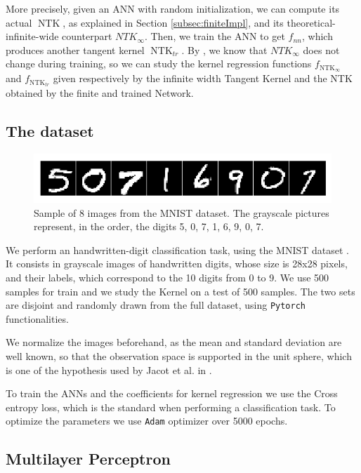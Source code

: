 \documentclass[11pt,notitlepage]{article}
\numberwithin{equation}{section}
\DeclareMathOperator{\NTK}{NTK}
\theoremstyle{remark}
\theoremstyle{definition}
\begin{document}
	More precisely, given an ANN with random initialization, we can compute its actual $\NTK$, as explained in Section \ref{subsec:finiteImpl}, and its theoretical-infinite-wide counterpart $NTK_\infty$.
	Then, we train the ANN to get $f_{nn}$, which produces another tangent kernel $\NTK_{tr}$.
	By \cite{jacot2018neural}, we know that $NTK_\infty$ does not change during training, so we can study the kernel regression functions $f_{\NTK_\infty}$ and $f_{\NTK_{tr}}$ given respectively by the infinite width Tangent Kernel and the NTK obtained by the finite and trained Network.
	
	\subsection{The dataset}\label{subsec:dataset}
	
	\begin{figure}[t]
		\centering
		\includegraphics[width=.75\linewidth]{../Simulations/figures/mnist_sample.png}
		\caption{Sample of 8 images from the MNIST dataset.
			The grayscale pictures represent, in the order, the digits 5, 0, 7, 1, 6, 9, 0, 7.}
	\end{figure}
	
	We perform an handwritten-digit classification task, using the MNIST dataset \cite{lecun2010mnist}.
	It consists in grayscale images of handwritten digits, whose size is 28x28 pixels, and their labels, which correspond to the 10 digits from 0 to 9.    
	We use 500 samples for train and we study the Kernel on a test of 500 samples.
	The two sets are disjoint and randomly drawn from the full dataset, using \verb|Pytorch| functionalities.
	
	We normalize the images beforehand, as the mean and standard deviation are well known, so that the observation space is supported in the unit sphere, which is one of the hypothesis used by Jacot et al. in \cite{jacot2018neural}.
	
	To train the ANNs and the coefficients for kernel regression we use the Cross entropy loss, which is the standard when performing a classification task.
	To optimize the parameters we use \verb|Adam| optimizer \cite{kingma2014adam} over 5000 epochs.
	
	\subsection{Multilayer Perceptron}
	
\end{document}
